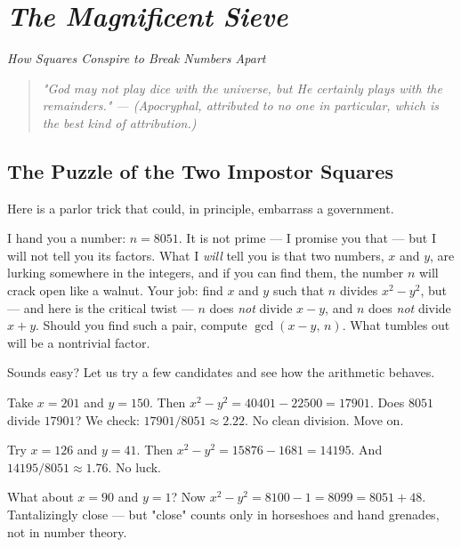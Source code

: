 \chapter{\textit{The Magnificent Sieve}}
\begin{center}\large\itshape \textit{How Squares Conspire to Break Numbers Apart}\end{center}
\medskip
\label{ch11}




\bigskip


\begin{quote}
\itshape \textit{"God may not play dice with the universe, but He certainly plays with the remainders."} --- (Apocryphal, attributed to no one in particular, which is the best kind of attribution.)
\end{quote}


\bigskip


\section{The Puzzle of the Two Impostor Squares}

Here is a parlor trick that could, in principle, embarrass a government.

I hand you a number: $n = 8051$. It is not prime --- I promise you that --- but I will not tell you its factors. What I \textit{will} tell you is that two numbers, $x$ and $y$, are lurking somewhere in the integers, and if you can find them, the number $n$ will crack open like a walnut. Your job: find $x$ and $y$ such that $n$ divides $x^2 - y^2$, but --- and here is the critical twist --- $n$ does \textit{not} divide $x - y$, and $n$ does \textit{not} divide $x + y$. Should you find such a pair, compute $\gcd(x - y, \, n)$. What tumbles out will be a nontrivial factor.

Sounds easy? Let us try a few candidates and see how the arithmetic behaves.

Take $x = 201$ and $y = 150$. Then $x^2 - y^2 = 40401 - 22500 = 17901$. Does $8051$ divide $17901$? We check: $17901 / 8051 \approx 2.22$. No clean division. Move on.

Try $x = 126$ and $y = 41$. Then $x^2 - y^2 = 15876 - 1681 = 14195$. And $14195 / 8051 \approx 1.76$. No luck.

What about $x = 90$ and $y = 1$? Now $x^2 - y^2 = 8100 - 1 = 8099 = 8051 + 48$. Tantalizingly close --- but "close" counts only in horseshoes and hand grenades, not in number theory.

